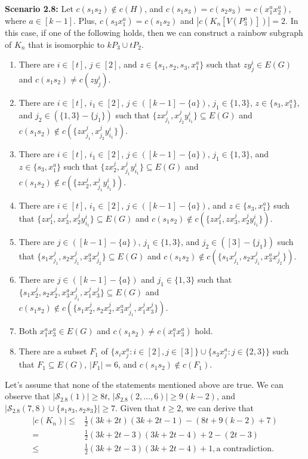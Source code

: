 \documentclass[12pt]{article}
\begin{document}
 {\bf Scenario 2.8:} Let \(c(s_1s_2) \notin c(H)\), and \(c(s_1s_3) = c(s_2s_3) = c(x^a_1x^a_2)\), where \(a \in [k-1]\). Plus, $c(s_3x^a_1)=c(s_1s_2)$ and \(|c(K_n[V(P^a_3)])| =2\).
 In this case, if one of the following holds, then we can construct a rainbow subgraph of \(K_n\) that is isomorphic to \(kP_3 \cup tP_2\). 
 \begin{enumerate}
   \item There are $i\in[t]$, $j\in[2]$, and $z\in\{s_1,s_2,s_3,x^a_1\}$ such that $zy^i_j\in E(G)$ and $c(s_1s_2)\neq c(zy^i_j)$. 
    \item There are $i\in[t]$, $i_1\in[2]$, $j\in([k-1]-\{a\})$, $j_1\in\{1,3\}$, $z\in\{s_3,x_1^a\}$, and $j_2\in(\{1,3\}-\{j_1\})$ such that $\{zx^j_{j_1},x^j_{j_2}y^i_{i_1}\}\subseteq E(G)$ and $c(s_1s_2)\not\in c(\{zx^j_{j_1},x^j_{j_2}y^i_{i_1}\})$.
   \item There are $i\in[t]$, $i_1\in[2]$, $j\in([k-1]-\{a\})$, $j_1\in\{1,3\}$, and $z\in\{s_3,x_1^a\}$ such that $\{zx^j_{2},x^j_{j_1}y^i_{i_1}\}\subseteq E(G)$ and $c(s_1s_2)\not\in c(\{zx^j_{2},x^j_{j_1}y^i_{i_1}\})$.
   \item There are $i\in[t]$, $i_1\in[2]$, $j\in([k-1]-\{a\})$, and $z\in\{s_3,x_1^a\}$ such that $\{zx^j_{1},zx^j_3,x^j_{2}y^i_{i_1}\}\subseteq E(G)$ and  $c(s_1s_2)\not\in c(\{zx^j_{1},zx^j_3,x^j_{2}y^i_{i_1}\})$. 
   \item There are  $j\in([k-1]-\{a\})$, $j_1\in\{1,3\}$, and  $j_2\in([3]-\{j_1\})$ such that $\{s_1x^j_{j_1},s_2x^j_{j_1},x^a_3x^j_{j_2}\}\subseteq E(G)$ and $c(s_1s_2)\not\in c(\{s_1x^j_{j_1},s_2x^j_{j_1},x^a_3x^j_{j_2}\})$.
   \item There are $j\in([k-1]-\{a\})$ and $j_1\in\{1,3\}$ such that $\{s_1x^j_{2},s_2x^j_{2},x^a_3x^j_{j_1},x_1^jx_3^j\}\subseteq E(G)$ and  $c(s_1s_2)\not\in c(\{s_1x^j_{2},s_2x^j_{2},x^a_3x^j_{j_1},x_1^jx_3^j\})$.
   \item Both \( x_1^ax_3^a\in E(G) \) and $c(s_1s_2)\neq c(x_1^ax_3^a)$ hold.
   \item There are a subset $F_1$ of $\{s_ix^a_j:i\in[2],j\in[3]\}\cup\{s_3x^a_j:j\in\{2,3\}\}$ such that $F_1\subseteq E(G)$, $|F_1|=6$, and $c(s_1s_2)\not\in c(F_1)$.
 \end{enumerate}
Let's assume that none of the statements mentioned above are true. We can observe that \( |\mathcal{S}_{2.8}(1)| \geq 8t \), \( |\mathcal{S}_{2.8}(2,\ldots,6)| \geq 9(k-2) \), and \( |\mathcal{S}_{2.8}(7,8) \cup \{s_1s_3,s_2s_3\}| \geq 7 \). Given that \( t \geq 2 \), we can derive that
\begin{align*}
  |c(K_n)|\leq & \frac{1}{2}(3k+2t)(3k+2t-1)-(8t+9(k-2)+7)\\
  =& \frac{1}{2}(3k+2t-3)(3k+2t-4)+2-(2t-3)\\
  \leq &\frac{1}{2}(3k+2t-3)(3k+2t-4)+1, \text{a contradiction}.
\end{align*} 
\end{document}
